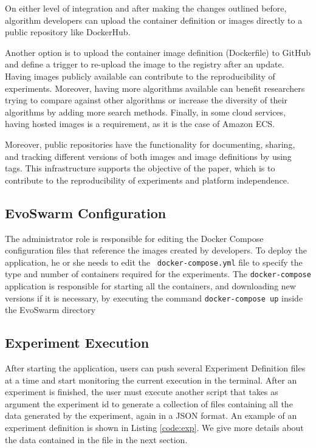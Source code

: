 \documentclass[review]{elsarticle}
\begin{document}
On either level of integration and after making the changes outlined before,
algorithm developers can upload the container 
definition or images directly to a public repository like DockerHub. 

Another option is to upload the container image definition (Dockerfile) to GitHub and
define a trigger to re-upload the image to the registry after an update. Having
images publicly available can contribute to the reproducibility of experiments.
Moreover, having more algorithms available can benefit researchers trying to
compare against other algorithms or increase the diversity of their algorithms
by adding more search methods. Finally, in some cloud services, having hosted
images is a requirement, as it is the case of Amazon ECS.

Moreover, public repositories have the functionality for documenting, sharing,
and tracking different versions of both images and image definitions by using
tags. This infrastructure supports the objective of the paper, which is to
contribute to the reproducibility of experiments and platform independence.


\subsection{EvoSwarm Configuration}
\label{sec:evoswarm:config}
The administrator role is responsible for
editing the Docker Compose configuration files that reference the images created
by developers. To deploy the application, he or she needs to edit the {\tt
docker-compose.yml} file to specify the type and number of containers required
for the experiments. The {\tt docker-compose} application is responsible for
starting all the containers, and downloading new versions if it is necessary,
by executing the command {\tt docker-compose up}  inside the EvoSwarm directory


\subsection{Experiment Execution}
\label{sec:exeperimentalDefinition}

After starting the application, users can push several Experiment Definition 
files at a time and start monitoring the current execution in the terminal.
After an experiment is finished, the user must execute another script
that takes as argument the experiment id to generate a collection of files containing all the
data generated by the experiment, again in a JSON format. An example of an 
experiment definition is shown in Listing \ref{code:exp}. We give more details about the 
data contained in the file in the next section.
\end{document}
